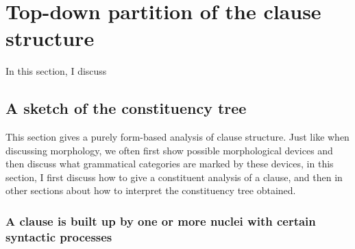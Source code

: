 \documentclass{article}
\begin{document}
\section{Top-down partition of the clause structure}\label{sec:clause-top-down}

In this section,
I discuss 

\subsection{A sketch of the constituency tree}\label{sec:ica-clause}

This section gives a purely form-based analysis of clause structure.
Just like when discussing morphology,
we often first show possible morphological devices 
and then discuss what grammatical categories are marked by these devices,
in this section, I first discuss how to give a constituent analysis of a clause,
and then in other sections about how to interpret the constituency tree obtained.

\subsubsection{A clause is built up by one or more nuclei with certain syntactic processes}\label{sec:nucleus-to-clause}
\end{document}
